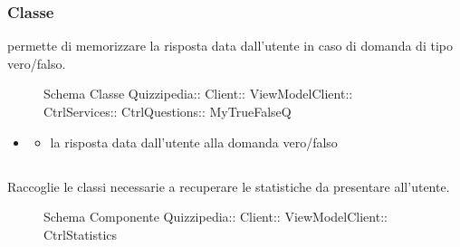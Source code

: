 \subsubsection{Classe }
permette di memorizzare la risposta data dall'utente in caso di domanda di tipo vero/falso.
\begin{figure}[H]
\centering
\noindent{}
\caption[Schema Classe MyTrueFalseQ]{Schema Classe Quizzipedia:: Client:: ViewModelClient:: CtrlServices:: CtrlQuestions:: MyTrueFalseQ}
\end{figure}
\begin{itemize}
\item {}
\begin{itemize}
\item {}
\newline
la risposta data dall'utente alla domanda vero/falso
\end{itemize}
\end{itemize}
\subsection{}
Raccoglie le classi necessarie a recuperare le statistiche da presentare all'utente.
\begin{figure}[H]
\centering
\noindent{}
\caption[Schema Componente CtrlStatistics]{Schema Componente Quizzipedia:: Client:: ViewModelClient:: CtrlStatistics}
\end{figure}
